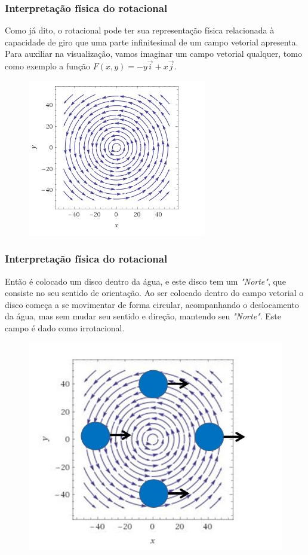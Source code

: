 \begin{frame}
    \frametitle{Interpretação física do rotacional}
    \justifying
    Como já dito, o rotacional pode ter sua representação física relacionada à capacidade de giro que uma parte infinitesimal de um campo vetorial apresenta. Para auxiliar na visualização, vamos imaginar um campo vetorial qualquer, tomo como exemplo a função $F(x,y)=-y\vec{i}+x\vec{j}$.
    
    \begin{figure}[h]
        \centering
        \includegraphics[scale=0.7]{img/Campo_Vetorial.jpg}
    \end{figure}
\end{frame}

\begin{frame}
    \frametitle{Interpretação física do rotacional}
    \justifying
    Então é colocado um disco dentro da água, e este disco tem um \textit{"Norte"}, que consiste no seu sentido de orientação. Ao ser colocado dentro do campo vetorial o disco começa a se movimentar de forma circular, acompanhando o deslocamento da água, mas sem mudar seu sentido e direção, mantendo seu \textit{"Norte"}. Este campo é dado como irrotacional.
    
    \begin{figure}[h]
        \centering
        \includegraphics[scale=0.4]{img/Campo_Vetorial_com_Disco.jpg}
    \end{figure}
\end{frame}

